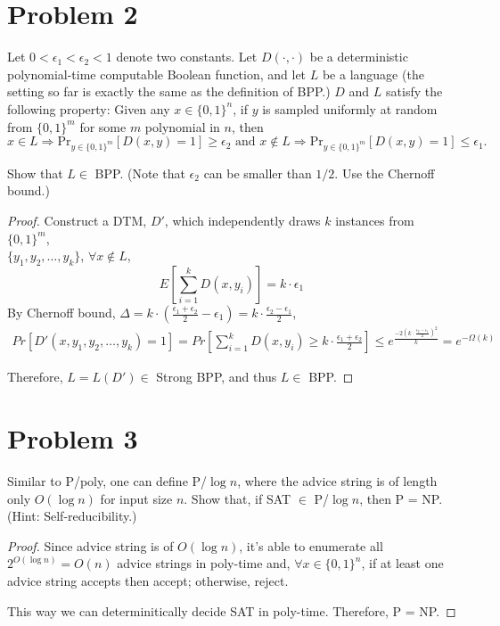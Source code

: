 \documentclass[twoside,11pt]{homework}
\begin{document}
\section*{Problem 2}
Let $0 < \epsilon_1 < \epsilon_2 < 1$ denote two constants. Let $D(\cdot, \cdot)$ be a deterministic
polynomial-time computable Boolean function, and let $L$ be a language (the
setting so far is exactly the same as the definition of BPP.)
$D$ and $L$ satisfy the following property:
Given any $x \in \{0, 1\}^n$, if $y$ is sampled uniformly at random from $\{ 0,1
\}^m$ for some $m$ polynomial in $n$, then
\[
  x \in L \Rightarrow \text{Pr}_{y \in \{0,1\}^m}[D(x,y) = 1] \ge \epsilon_2
  \text{ and }
  x \notin L \Rightarrow \text{Pr}_{y \in \{0,1\}^m}[D(x,y) = 1] \le \epsilon_1.
\]

Show that $L \in$ BPP.
(Note that $\epsilon_2$ can be smaller than $1/2$.
  Use the Chernoff bound.)

\begin{proof}
  Construct a DTM, $D'$, which independently draws $k$ instances from
  $\{0,1\}^m$,\\ $\{y_1, y_2, \dots, y_k\}$, $\forall x \notin L$,
  \[
    E[ \sum_{i = 1}^k D(x,y_i) ] = k \cdot \epsilon_1
  \]
  By Chernoff bound, $\Delta = k \cdot (\frac{\epsilon_1 + \epsilon_2}{2} - \epsilon_1) = k \cdot \frac{\epsilon_2 - \epsilon_1}{2}$,
  \[
    \begin{aligned}
      Pr[D'(x, y_1, y_2, \dots, y_k) = 1]
      = Pr[ \sum_{i = 1}^k D(x,y_i) \ge k \cdot \frac{\epsilon_1 + \epsilon_2}{2}]
      \le e^{\frac{-2 (k \cdot \frac{\epsilon_2 - \epsilon_1}{2})^2}{k}} = e^{-\Omega(k)}
    \end{aligned}
  \]

  Therefore, $L = L(D') \in$ Strong BPP, and thus $L \in$ BPP.
\end{proof}

\section*{Problem 3}

\begin{prob}
  Similar to P/poly, one can define P/$\log n$, where the advice string is of
  length only $O(\log n)$ for input size $n$.
  Show that, if SAT $\in$ P/$\log n$, then P = NP.
  (Hint: Self-reducibility.)
\end{prob}

\begin{proof}
  Since advice string is of $O(\log n)$, it's able to enumerate all 
  $2^{O(\log n)} = O(n)$ advice strings in poly-time and, $\forall x \in \{0,1\}^n$,
  if at least one advice string accepts then accept; otherwise, reject.
  
  This way we can determinitically decide SAT in poly-time.
  Therefore, P = NP.
\end{proof}
\end{document}
